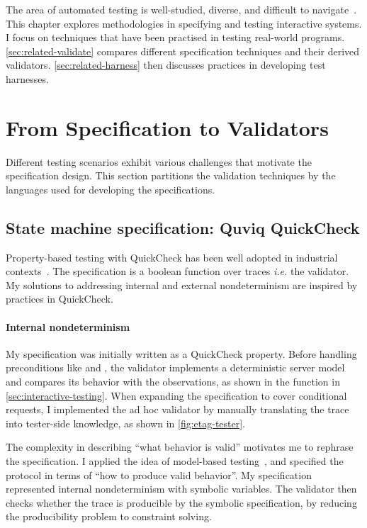 The area of automated testing is well-studied, diverse, and difficult to
navigate~\cite{anand2013orchestrated}.  This chapter explores methodologies in
specifying and testing interactive systems.  I focus on techniques that have
been practised in testing real-world programs.  \autoref{sec:related-validate}
compares different specification techniques and their derived validators.
\autoref{sec:related-harness} then discusses practices in developing test
harnesses.

\section{From Specification to Validators}
\label{sec:related-validate}

Different testing scenarios exhibit various challenges that motivate the
specification design.  This section partitions the validation techniques by the
languages used for developing the specifications.

\subsection{State machine specification: Quviq QuickCheck}
Property-based testing with QuickCheck has been well adopted in industrial
contexts~\cite{Hughes2016}.  The specification is a boolean function over traces
{\it i.e.} the validator.  My solutions to addressing internal and external
nondeterminism are inspired by practices in QuickCheck.

\paragraph{Internal nondeterminism}
My \http specification was initially written as a QuickCheck property.  Before
handling preconditions like  and , the
validator implements a deterministic server model and compares its behavior with
the observations, as shown in the  function in
\autoref{sec:interactive-testing}.  When expanding the specification to cover
conditional requests, I implemented the ad hoc validator by manually translating
the trace into tester-side knowledge, as shown in \autoref{fig:etag-tester}.

The complexity in describing ``what behavior is valid'' motivates me to rephrase
the specification.  I applied the idea of model-based
testing~\cite{broy2005model}, and specified the protocol in terms of ``how to
produce valid behavior''.  My specification represented internal nondeterminism
with symbolic variables.  The validator then checks whether the trace is
producible by the symbolic specification, by reducing the producibility problem
to constraint solving.

